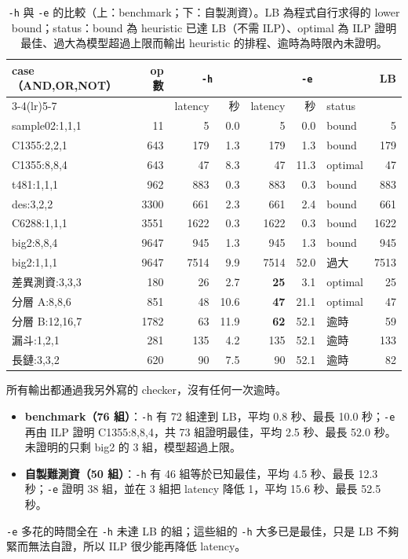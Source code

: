 \documentclass[12pt,a4paper]{article}
\begin{document}
\begin{table}[h]
\centering\small
\caption{\texttt{-h} 與 \texttt{-e} 的比較（上：benchmark；下：自製測資）。LB 為程式自行求得的 lower bound；status：bound 為 heuristic 已達 LB（不需 ILP）、optimal 為 ILP 證明最佳、過大為模型超過上限而輸出 heuristic 的排程、逾時為時限內未證明。}
\label{tab:results}
\begin{tabular}{lrrrrrlr}
\toprule
case（AND,OR,NOT） & op 數 & \multicolumn{2}{c}{\texttt{-h}} & \multicolumn{3}{c}{\texttt{-e}} & LB \\
\cmidrule(lr){3-4}\cmidrule(lr){5-7}
& & latency & 秒 & latency & 秒 & status & \\
\midrule
sample02:1,1,1 & 11 & 5 & 0.0 & 5 & 0.0 & bound & 5 \\
C1355:2,2,1 & 643 & 179 & 1.3 & 179 & 1.3 & bound & 179 \\
C1355:8,8,4 & 643 & 47 & 8.3 & 47 & 11.3 & optimal & 47 \\
t481:1,1,1 & 962 & 883 & 0.3 & 883 & 0.3 & bound & 883 \\
des:3,2,2 & 3300 & 661 & 2.3 & 661 & 2.4 & bound & 661 \\
C6288:1,1,1 & 3551 & 1622 & 0.3 & 1622 & 0.3 & bound & 1622 \\
big2:8,8,4 & 9647 & 945 & 1.3 & 945 & 1.3 & bound & 945 \\
big2:1,1,1 & 9647 & 7514 & 9.9 & 7514 & 52.0 & 過大 & 7513 \\
\midrule
差異測資:3,3,3 & 180 & 26 & 2.7 & \textbf{25} & 3.1 & optimal & 25 \\
分層 A:8,8,6 & 851 & 48 & 10.6 & \textbf{47} & 21.1 & optimal & 47 \\
分層 B:12,16,7 & 1782 & 63 & 11.9 & \textbf{62} & 52.1 & 逾時 & 59 \\
漏斗:1,2,1 & 281 & 135 & 4.2 & 135 & 52.1 & 逾時 & 133 \\
長鏈:3,3,2 & 620 & 90 & 7.5 & 90 & 52.1 & 逾時 & 82 \\
\bottomrule
\end{tabular}
\end{table}

所有輸出都通過我另外寫的 checker，沒有任何一次逾時。
\begin{itemize}
\item \textbf{benchmark（76 組）}：\texttt{-h} 有 72 組達到 LB，平均 0.8 秒、最長 10.0 秒；\texttt{-e} 再由 ILP 證明 C1355:8,8,4，共 73 組證明最佳，平均 2.5 秒、最長 52.0 秒。未證明的只剩 big2 的 3 組，模型超過上限。
\item \textbf{自製難測資（50 組）}：\texttt{-h} 有 46 組等於已知最佳，平均 4.5 秒、最長 12.3 秒；\texttt{-e} 證明 38 組，並在 3 組把 latency 降低 1，平均 15.6 秒、最長 52.5 秒。
\end{itemize}
\texttt{-e} 多花的時間全在 \texttt{-h} 未達 LB 的組；這些組的 \texttt{-h} 大多已是最佳，只是 LB 不夠緊而無法自證，所以 ILP 很少能再降低 latency。
\end{document}
